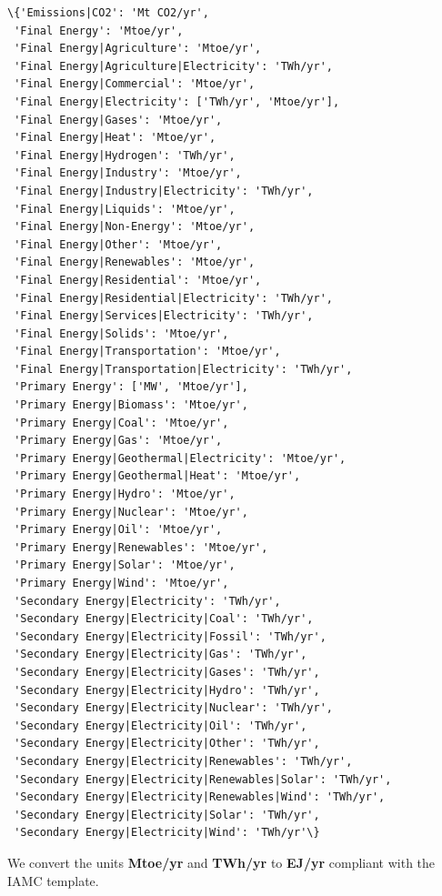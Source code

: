 \documentclass[11pt]{article}
\makeatletter
\newcommand{\boxspacing}{\kern\kvtcb@left@rule\kern\kvtcb@boxsep}
\newcommand{\prompt}[4]{
        {\ttfamily\llap{{\color{#2}[#3]:\hspace{3pt}#4}}\vspace{-\baselineskip}}
    }
\makeatother
\begin{document}
            \begin{tcolorbox}[breakable, size=fbox, boxrule=.5pt, pad at break*=1mm, opacityfill=0]
\prompt{Out}{outcolor}{7}{\boxspacing}
\begin{Verbatim}[commandchars=\\\{\}]
\{'Emissions|CO2': 'Mt CO2/yr',
 'Final Energy': 'Mtoe/yr',
 'Final Energy|Agriculture': 'Mtoe/yr',
 'Final Energy|Agriculture|Electricity': 'TWh/yr',
 'Final Energy|Commercial': 'Mtoe/yr',
 'Final Energy|Electricity': ['TWh/yr', 'Mtoe/yr'],
 'Final Energy|Gases': 'Mtoe/yr',
 'Final Energy|Heat': 'Mtoe/yr',
 'Final Energy|Hydrogen': 'TWh/yr',
 'Final Energy|Industry': 'Mtoe/yr',
 'Final Energy|Industry|Electricity': 'TWh/yr',
 'Final Energy|Liquids': 'Mtoe/yr',
 'Final Energy|Non-Energy': 'Mtoe/yr',
 'Final Energy|Other': 'Mtoe/yr',
 'Final Energy|Renewables': 'Mtoe/yr',
 'Final Energy|Residential': 'Mtoe/yr',
 'Final Energy|Residential|Electricity': 'TWh/yr',
 'Final Energy|Services|Electricity': 'TWh/yr',
 'Final Energy|Solids': 'Mtoe/yr',
 'Final Energy|Transportation': 'Mtoe/yr',
 'Final Energy|Transportation|Electricity': 'TWh/yr',
 'Primary Energy': ['MW', 'Mtoe/yr'],
 'Primary Energy|Biomass': 'Mtoe/yr',
 'Primary Energy|Coal': 'Mtoe/yr',
 'Primary Energy|Gas': 'Mtoe/yr',
 'Primary Energy|Geothermal|Electricity': 'Mtoe/yr',
 'Primary Energy|Geothermal|Heat': 'Mtoe/yr',
 'Primary Energy|Hydro': 'Mtoe/yr',
 'Primary Energy|Nuclear': 'Mtoe/yr',
 'Primary Energy|Oil': 'Mtoe/yr',
 'Primary Energy|Renewables': 'Mtoe/yr',
 'Primary Energy|Solar': 'Mtoe/yr',
 'Primary Energy|Wind': 'Mtoe/yr',
 'Secondary Energy|Electricity': 'TWh/yr',
 'Secondary Energy|Electricity|Coal': 'TWh/yr',
 'Secondary Energy|Electricity|Fossil': 'TWh/yr',
 'Secondary Energy|Electricity|Gas': 'TWh/yr',
 'Secondary Energy|Electricity|Gases': 'TWh/yr',
 'Secondary Energy|Electricity|Hydro': 'TWh/yr',
 'Secondary Energy|Electricity|Nuclear': 'TWh/yr',
 'Secondary Energy|Electricity|Oil': 'TWh/yr',
 'Secondary Energy|Electricity|Other': 'TWh/yr',
 'Secondary Energy|Electricity|Renewables': 'TWh/yr',
 'Secondary Energy|Electricity|Renewables|Solar': 'TWh/yr',
 'Secondary Energy|Electricity|Renewables|Wind': 'TWh/yr',
 'Secondary Energy|Electricity|Solar': 'TWh/yr',
 'Secondary Energy|Electricity|Wind': 'TWh/yr'\}
\end{Verbatim}
\end{tcolorbox}
        
    We convert the units \textbf{Mtoe/yr} and \textbf{TWh/yr} to
\textbf{EJ/yr} compliant with the IAMC template.
\end{document}
